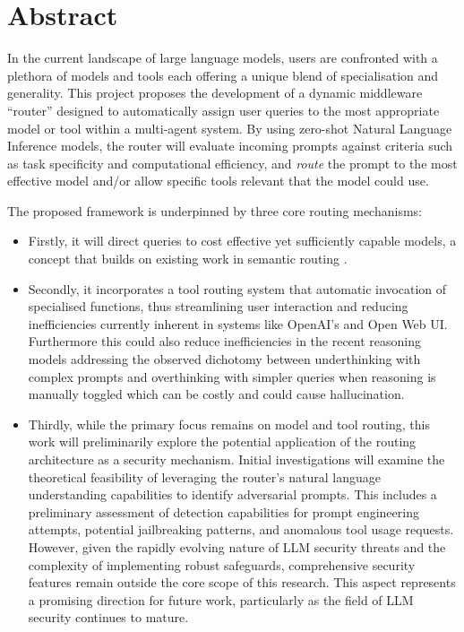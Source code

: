 \chapter*{\center \Large  Abstract}

\noindent In the current landscape of large language models, users are confronted with a plethora of models and tools each offering a unique blend of specialisation and generality. This project proposes the development of a dynamic middleware ``router'' designed to automatically assign user queries to the most appropriate model or tool within a multi-agent system. By using zero-shot Natural Language Inference models, the router will evaluate incoming prompts against criteria such as task specificity and computational efficiency, and \textit{route} the prompt to the most effective model and/or allow specific tools relevant that the model could use.

The proposed framework is underpinned by three core routing mechanisms:

\begin{itemize}
    \item Firstly, it will direct queries to cost effective yet sufficiently capable models, a concept that builds on existing work in semantic routing \cite{ong2025routellmlearningroutellms}.
    
    \item Secondly, it incorporates a tool routing system that automatic invocation of specialised functions, thus streamlining user interaction and reducing inefficiencies currently inherent in systems like OpenAI's and Open Web UI. Furthermore this could also reduce inefficiencies in the recent reasoning models addressing the observed dichotomy between underthinking with complex prompts and overthinking with simpler queries when reasoning is manually toggled which can be costly and could cause hallucination.
    
    \item Thirdly, while the primary focus remains on model and tool routing, this work will preliminarily explore the potential application of the routing architecture as a security mechanism. Initial investigations will examine the theoretical feasibility of leveraging the router's natural language understanding capabilities to identify adversarial prompts. This includes a preliminary assessment of detection capabilities for prompt engineering attempts, potential jailbreaking patterns, and anomalous tool usage requests. However, given the rapidly evolving nature of LLM security threats and the complexity of implementing robust safeguards, comprehensive security features remain outside the core scope of this research. This aspect represents a promising direction for future work, particularly as the field of LLM security continues to mature.
\end{itemize}

